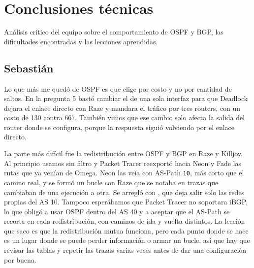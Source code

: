\section{Conclusiones técnicas}

Análisis crítico del equipo sobre el comportamiento de OSPF y BGP, las dificultades encontradas y las lecciones aprendidas.

\subsection*{Sebastián}
Lo que más me quedó de OSPF es que elige por costo y no por cantidad de saltos. En la pregunta 5 bastó cambiar el  de una sola interfaz para que Deadlock dejara el enlace directo con Raze y mandara el tráfico por tres routers, con un costo de 130 contra 667. También vimos que ese cambio solo afecta la salida del router donde se configura, porque la respuesta siguió volviendo por el enlace directo.

La parte más difícil fue la redistribución entre OSPF y BGP en Raze y Killjoy. Al principio usamos  sin filtro y Packet Tracer reexportó hacia Neon y Fade las rutas que ya venían de Omega. Neon las veía con AS-Path \texttt{10}, más corto que el camino real, y se formó un bucle con Raze que se notaba en trazas que cambiaban de una ejecución a otra. Se arregló con , que deja salir solo las redes propias del AS 10. Tampoco esperábamos que Packet Tracer no soportara iBGP, lo que obligó a usar OSPF dentro del AS 40 y a aceptar que el AS-Path se recorta en cada redistribución, con caminos de ida y vuelta distintos. La lección que saco es que la redistribución mutua funciona, pero cada punto donde se hace es un lugar donde se puede perder información o armar un bucle, así que hay que revisar las tablas y repetir las trazas varias veces antes de dar una configuración por buena.

